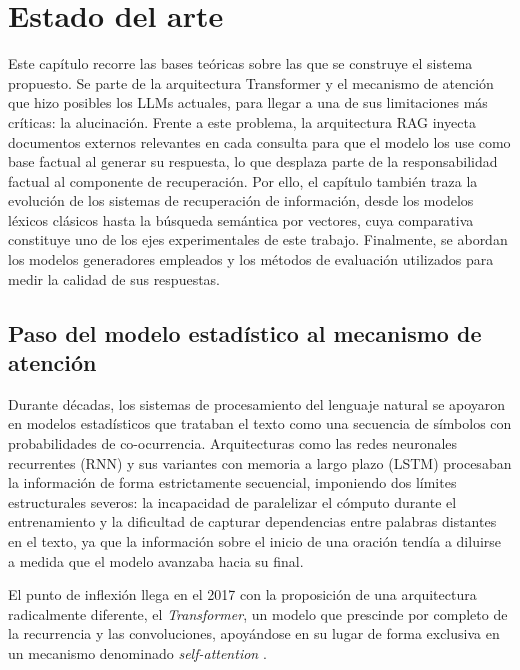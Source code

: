 

\chapter{Estado del arte}

Este capítulo recorre las bases teóricas sobre las que se construye el sistema propuesto. Se parte de la arquitectura Transformer y el mecanismo de atención \cite{vaswani2017attention} que hizo posibles los LLMs actuales, para llegar a una de sus limitaciones más críticas: la alucinación. Frente a este problema, la arquitectura RAG inyecta documentos externos relevantes en cada consulta para que el modelo los use como base factual al generar su respuesta, lo que desplaza parte de la responsabilidad factual al componente de recuperación. Por ello, el capítulo también traza la evolución de los sistemas de recuperación de información, desde los modelos léxicos clásicos hasta la búsqueda semántica por vectores, cuya comparativa constituye uno de los ejes experimentales de este trabajo. Finalmente, se abordan los modelos generadores empleados y los métodos de evaluación utilizados para medir la calidad de sus respuestas.

\section{Paso del modelo estadístico al mecanismo de atención}

Durante décadas, los sistemas de procesamiento del lenguaje natural se apoyaron en modelos estadísticos que trataban el texto como una secuencia de símbolos con probabilidades de co-ocurrencia. Arquitecturas como las redes neuronales recurrentes (RNN) y sus variantes con memoria a largo plazo (LSTM) procesaban la información de forma estrictamente secuencial, imponiendo dos límites estructurales severos: la incapacidad de paralelizar el cómputo durante el entrenamiento y la dificultad de capturar dependencias entre palabras distantes en el texto, ya que la información sobre el inicio de una oración tendía a diluirse a medida que el modelo avanzaba hacia su final.

El punto de inflexión llega en el 2017 con la proposición de una arquitectura radicalmente diferente, el \textit{Transformer}, un modelo que prescinde por completo de la recurrencia y las convoluciones, apoyándose en su lugar de forma exclusiva en un mecanismo denominado \textit{self-attention} \cite{vaswani2017attention}.


